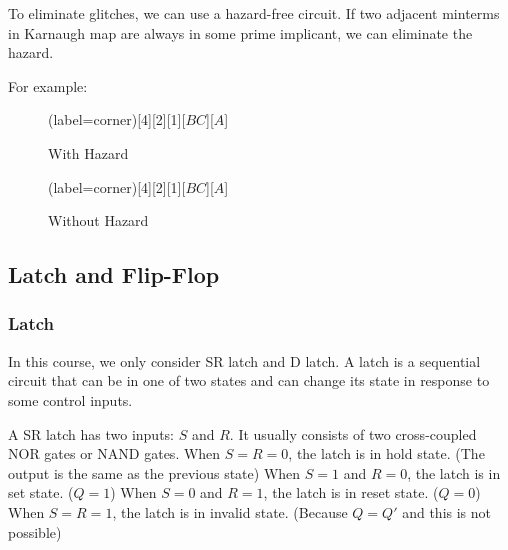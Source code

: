 \documentclass[a4paper,12pt]{article}
\begin{document}
\begin{center}
\end{center}

To eliminate glitches, we can use a hazard-free circuit.
If two adjacent minterms in Karnaugh map are always in some prime implicant, we can eliminate the hazard.

For example:
\begin{figure}[H]
	\begin{minipage}{0.5\textwidth}
		\centering
		\begin{karnaugh-map}(label=corner)[4][2][1][$BC$][$A$]
			\autoterms[0]
		\end{karnaugh-map}
		\caption*{With Hazard}
	\end{minipage}
	\begin{minipage}{0.5\textwidth}
		\centering
		\begin{karnaugh-map}(label=corner)[4][2][1][$BC$][$A$]
			\autoterms[0]
		\end{karnaugh-map}
		\caption*{Without Hazard}
	\end{minipage}
\end{figure}

\subsection{Latch and Flip-Flop}

\subsubsection{Latch}

In this course, we only consider SR latch and D latch.
A latch is a sequential circuit that can be in one of two states and can change its state in response to some control inputs.

A SR latch has two inputs: $S$ and $R$.
It usually consists of two cross-coupled NOR gates or NAND gates.
When $S = R = 0$, the latch is in hold state. (The output is the same as the previous state)
When $S = 1$ and $R = 0$, the latch is in set state. ($Q = 1$)
When $S = 0$ and $R = 1$, the latch is in reset state. ($Q = 0$)
When $S = R = 1$, the latch is in invalid state. (Because $Q = Q'$ and this is not possible)
\end{document}
